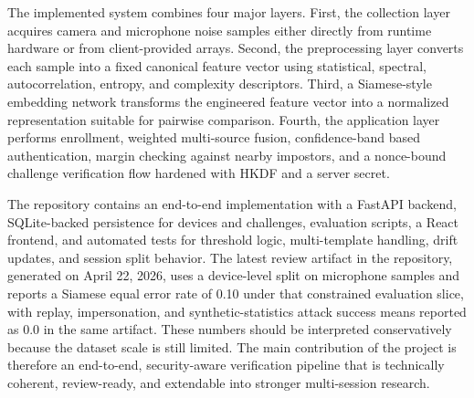 \documentclass[12pt]{report}
\begin{document}
The implemented system combines four major layers. First, the collection layer acquires camera and microphone noise samples either directly from runtime hardware or from client-provided arrays. Second, the preprocessing layer converts each sample into a fixed canonical feature vector using statistical, spectral, autocorrelation, entropy, and complexity descriptors. Third, a Siamese-style embedding network transforms the engineered feature vector into a normalized representation suitable for pairwise comparison. Fourth, the application layer performs enrollment, weighted multi-source fusion, confidence-band based authentication, margin checking against nearby impostors, and a nonce-bound challenge verification flow hardened with HKDF and a server secret.

The repository contains an end-to-end implementation with a FastAPI backend, SQLite-backed persistence for devices and challenges, evaluation scripts, a React frontend, and automated tests for threshold logic, multi-template handling, drift updates, and session split behavior. The latest review artifact in the repository, generated on April 22, 2026, uses a device-level split on microphone samples and reports a Siamese equal error rate of 0.10 under that constrained evaluation slice, with replay, impersonation, and synthetic-statistics attack success means reported as 0.0 in the same artifact. These numbers should be interpreted conservatively because the dataset scale is still limited. The main contribution of the project is therefore an end-to-end, security-aware verification pipeline that is technically coherent, review-ready, and extendable into stronger multi-session research.

\newpage
\listoftables
{}
\newpage
\listoffigures
{}
\newpage
\end{document}
